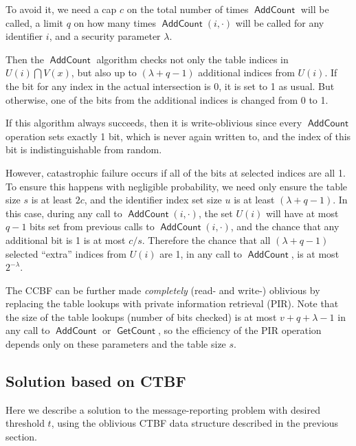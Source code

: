 \documentclass[letterpaper,12pt]{article}
\DeclareMathOperator{\AddCount}{\textsf{AddCount}}
\DeclareMathOperator{\GetCount}{\textsf{GetCount}}
\begin{document}
To avoid it, we need a cap $c$ on the total number of times $\AddCount$
will be called, a limit $q$ on how many times $\AddCount(i,\cdot)$
will be called for any identifier $i$, and a security parameter
$\lambda$.

Then the $\AddCount$ algorithm checks not only the table indices in
$U(i)\bigcap V(x)$, but also up to $(\lambda+q-1)$ additional indices from
$U(i)$. If the bit for any index in the actual intersection is 0, it is
set to 1 as usual. But otherwise, one of the bits from the additional
indices is changed from 0 to 1.

If this algorithm always succeeds, then it is write-oblivious since
every $\AddCount$ operation sets exactly 1 bit, which is never again
written to, and the index of this bit is indistinguishable from random.

However, catastrophic failure occurs if all of the bits at selected
indices are all 1. To ensure this happens with negligible probability,
we need only ensure the table size $s$ is at least $2c$, and the
identifier index set size $u$ is at least $(\lambda + q-1)$. In this case,
during any call to $\AddCount(i,\cdot)$, the set $U(i)$ will have at
most $q-1$ bits set from previous calls to $\AddCount(i,\cdot)$, and the
chance that any additional bit is 1 is at most $c/s$. Therefore the
chance that all $(\lambda+q-1)$ selected ``extra'' indices from $U(i)$
are 1, in any call to $\AddCount$, is at most $2^{-\lambda}$.

The CCBF can be further made \emph{completely} (read- and write-)
oblivious by replacing the table lookups with private information
retrieval (PIR). Note that the size of the table lookups (number of bits
checked) is at most $v+q+\lambda-1$ in any call to $\AddCount$ or
$\GetCount$, so the efficiency of the PIR operation depends only on
these parameters and the table size $s$.

\subsection{Solution based on CTBF}

Here we describe a solution to the message-reporting problem with
desired threshold $t$, using the oblivious CTBF data structure described
in the previous section.
\end{document}
